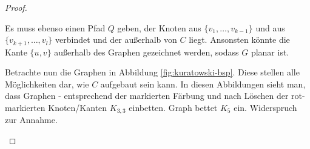\begin{proof}
\begin{description}
        Es muss ebenso einen Pfad $ Q $ geben, der Knoten aus $ \{ v_1, \dots, v_{k - 1} \} $ und aus $ \{ v_{k + 1}, \dots, v_l \} $ verbindet und der außerhalb von $ C $ liegt.
        Ansonsten könnte die Kante $ \{ u, v \} $ außerhalb des Graphen gezeichnet werden, sodass $ G $ planar ist.

        Betrachte nun die Graphen in Abbildung \ref{fig:kuratowski-bsp}.
        Diese stellen alle Möglichkeiten dar, wie $ C $ aufgebaut sein kann.
        In diesen Abbildungen sieht man, dass Graphen - entsprechend der markierten Färbung und nach Löschen der rot-markierten Knoten/Kanten $ K_{3,3} $ einbetten.
        Graph  bettet $ K_5 $ ein.
        Widerspruch zur Annahme.
    \end{description}


\end{proof}

